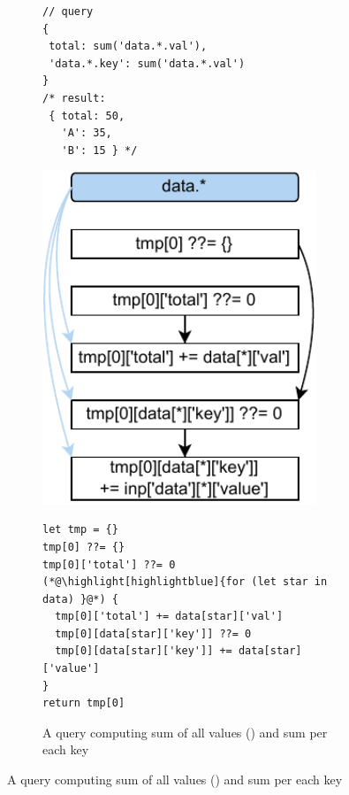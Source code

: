 \documentclass[runningheads]{llncs}
\begin{document}
\begin{figure}[t!]
\begin{subfigure}{\textwidth}
\begin{minipage}{0.25\textwidth}
\begin{lstlisting}[style=JavaScript, columns=flexible]
// query
{
 total: sum('data.*.val'),
 'data.*.key': sum('data.*.val')
}
/* result:
 { total: 50, 
   'A': 35,
   'B': 15 } */
\end{lstlisting}
\end{minipage}
\begin{minipage}{0.21\textwidth}
\centering
\includegraphics[width=0.9\textwidth]{images/intro_q2_ir.pdf}
\end{minipage}
\begin{minipage}{0.54\textwidth}
\begin{lstlisting}[style=JavaScript, columns=flexible]
let tmp = {}
tmp[0] ??= {}
tmp[0]['total'] ??= 0
(*@\highlight[highlightblue]{for (let star in data) }@*) {
  tmp[0]['total'] += data[star]['val']
  tmp[0][data[star]['key']] ??= 0
  tmp[0][data[star]['key']] += data[star]['value']
}
return tmp[0]
\end{lstlisting}
\end{minipage}
\caption{A query computing sum of all values
() and sum per each key}\label{fig:intro_q2}
\end{subfigure}


\end{figure}
\end{document}
